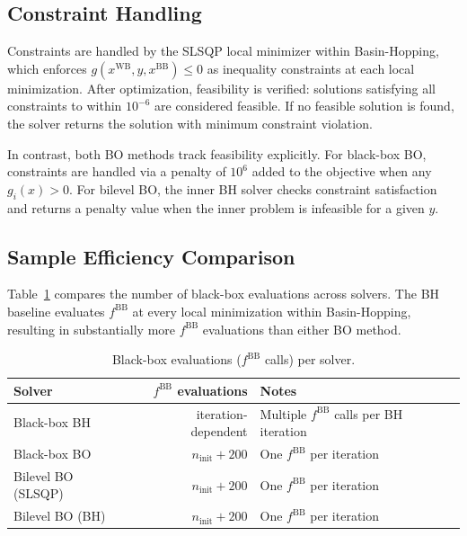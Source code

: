 \documentclass[12pt,a4paper]{article}%
\theoremstyle{plain}%
\theoremstyle{remark}%
\theoremstyle{definition}%
\def\WB{\mathrm{WB}}
\def\BB{\mathrm{BB}}
\begin{document}
\begin{appendices}
\subsection{Constraint Handling}\label{subsec:bh_constraints}

Constraints are handled by the SLSQP local minimizer within Basin-Hopping, which enforces $g(x^{\WB}, y, x^{\BB}) \leq 0$ as inequality constraints at each local minimization. After optimization, feasibility is verified: solutions satisfying all constraints to within $10^{-6}$ are considered feasible. If no feasible solution is found, the solver returns the solution with minimum constraint violation.

In contrast, both BO methods track feasibility explicitly. For black-box BO, constraints are handled via a penalty of $10^6$ added to the objective when any $g_i(x) > 0$. For bilevel BO, the inner BH solver checks constraint satisfaction and returns a penalty value when the inner problem is infeasible for a given $y$.

\subsection{Sample Efficiency Comparison}\label{subsec:bh_sample_efficiency}

Table~\ref{tab:sample_efficiency} compares the number of black-box evaluations across solvers. The BH baseline evaluates $f^{\BB}$ at every local minimization within Basin-Hopping, resulting in substantially more $f^{\BB}$ evaluations than either BO method.

\begin{table}[htbp]
\centering
\caption{Black-box evaluations ($f^{\BB}$ calls) per solver.}
\label{tab:sample_efficiency}
\begin{tabular}{@{}lrl@{}}
\toprule
\textbf{Solver} & \textbf{$f^{\BB}$ evaluations} & \textbf{Notes} \\
\midrule
Black-box BH & iteration-dependent & Multiple $f^{\BB}$ calls per BH iteration \\
Black-box BO & $n_\text{init} + 200$ & One $f^{\BB}$ per iteration \\
Bilevel BO (SLSQP) & $n_\text{init} + 200$ & One $f^{\BB}$ per iteration \\
Bilevel BO (BH) & $n_\text{init} + 200$ & One $f^{\BB}$ per iteration \\
\bottomrule
\end{tabular}
\end{table}


\end{appendices}
\end{document}

